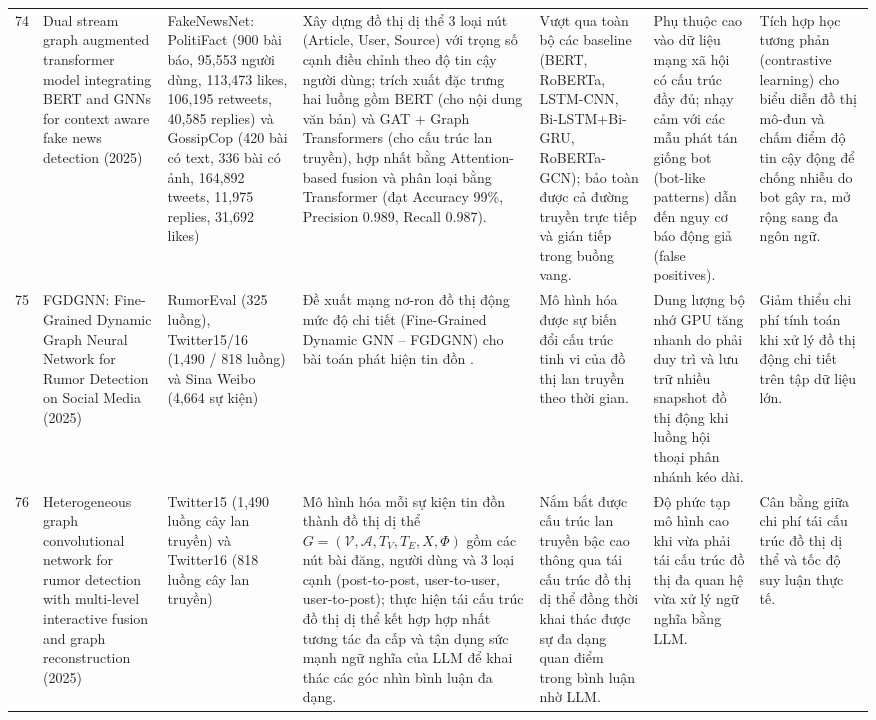 \documentclass[11pt,a4paper]{extreport}
\begin{document}
\begin{landscape}
\begin{longtable}{@{}C{0.6cm}p{3.6cm}p{2.7cm}p{4.8cm}p{3.6cm}p{3.6cm}p{3.6cm}@{}}
74 & Dual stream graph augmented transformer model integrating BERT and GNNs for context aware fake news detection (2025) \cite{noauthor_dual_2025} & FakeNewsNet: PolitiFact (900 bài báo, 95,553 người dùng, 113,473 likes, 106,195 retweets, 40,585 replies) và GossipCop (420 bài có text, 336 bài có ảnh, 164,892 tweets, 11,975 replies, 31,692 likes) & Xây dựng đồ thị dị thể 3 loại nút (Article, User, Source) với trọng số cạnh điều chỉnh theo độ tin cậy người dùng; trích xuất đặc trưng hai luồng gồm BERT (cho nội dung văn bản) và GAT + Graph Transformers (cho cấu trúc lan truyền), hợp nhất bằng Attention-based fusion và phân loại bằng Transformer (đạt Accuracy 99\%, Precision 0.989, Recall 0.987). & Vượt qua toàn bộ các baseline (BERT, RoBERTa, LSTM-CNN, Bi-LSTM+Bi-GRU, RoBERTa-GCN); bảo toàn được cả đường truyền trực tiếp và gián tiếp trong buồng vang. & Phụ thuộc cao vào dữ liệu mạng xã hội có cấu trúc đầy đủ; nhạy cảm với các mẫu phát tán giống bot (bot-like patterns) dẫn đến nguy cơ báo động giả (false positives). & Tích hợp học tương phản (contrastive learning) cho biểu diễn đồ thị mô-đun và chấm điểm độ tin cậy động để chống nhiễu do bot gây ra, mở rộng sang đa ngôn ngữ. \\ 

75 & FGDGNN: Fine-Grained Dynamic Graph Neural Network for Rumor Detection on Social Media (2025) \cite{noauthor_fgdgnn_2025} & RumorEval (325 luồng), Twitter15/16 (1,490 / 818 luồng) và Sina Weibo (4,664 sự kiện) & Đề xuất mạng nơ-ron đồ thị động mức độ chi tiết (Fine-Grained Dynamic GNN -- FGDGNN) cho bài toán phát hiện tin đồn \cite{noauthor_fgdgnn_2025}. & Mô hình hóa được sự biến đổi cấu trúc tinh vi của đồ thị lan truyền theo thời gian. & Dung lượng bộ nhớ GPU tăng nhanh do phải duy trì và lưu trữ nhiều snapshot đồ thị động khi luồng hội thoại phân nhánh kéo dài. & Giảm thiểu chi phí tính toán khi xử lý đồ thị động chi tiết trên tập dữ liệu lớn. \\ 

76 & Heterogeneous graph convolutional network for rumor detection with multi-level interactive fusion and graph reconstruction (2025) \cite{noauthor_heterogeneous_2025} & Twitter15 (1,490 luồng cây lan truyền) và Twitter16 (818 luồng cây lan truyền) & Mô hình hóa mỗi sự kiện tin đồn thành đồ thị dị thể $G=(\mathcal{V}, \mathcal{A}, T_V, T_E, X, \Phi)$ gồm các nút bài đăng, người dùng và 3 loại cạnh (post-to-post, user-to-user, user-to-post); thực hiện tái cấu trúc đồ thị dị thể kết hợp hợp nhất tương tác đa cấp và tận dụng sức mạnh ngữ nghĩa của LLM để khai thác các góc nhìn bình luận đa dạng. & Nắm bắt được cấu trúc lan truyền bậc cao thông qua tái cấu trúc đồ thị dị thể đồng thời khai thác được sự đa dạng quan điểm trong bình luận nhờ LLM. & Độ phức tạp mô hình cao khi vừa phải tái cấu trúc đồ thị đa quan hệ vừa xử lý ngữ nghĩa bằng LLM. & Cân bằng giữa chi phí tái cấu trúc đồ thị dị thể và tốc độ suy luận thực tế. \\ 


\end{longtable}
\end{landscape}
\end{document}
